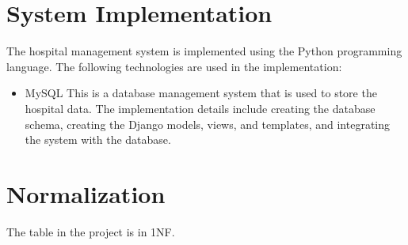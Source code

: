 \documentclass{article}
\begin{document}
\section{\textbf{System Implementation}}
The hospital management system is implemented using the Python programming language. The following technologies are used in the implementation:
\begin{itemize}
    \item MySQL\: This is a database management system that is used to store the hospital data.
    The implementation details include creating the database schema, creating the Django models, views, and templates, and integrating the system with the database.
    
\end{itemize}


\section{\textbf{Normalization}}
The table in the project is in 1NF.
\end{document}
